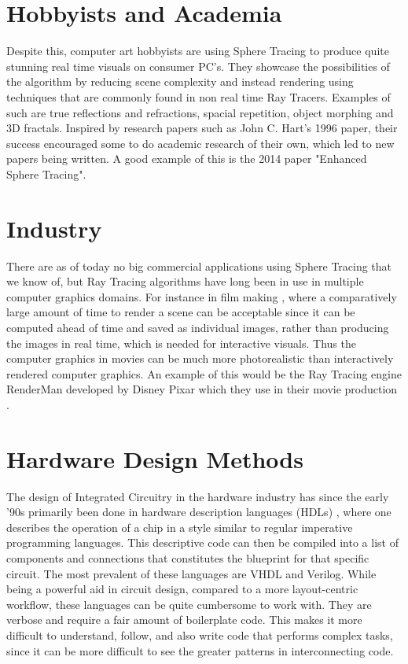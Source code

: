 	\section{ Hobbyists and Academia }

		Despite this, computer art hobbyists are using Sphere Tracing to
		produce quite stunning real time visuals on consumer PC's. They
		showcase the possibilities of the algorithm by reducing scene
		complexity and instead rendering using techniques that are commonly
		found in non real time Ray Tracers. Examples of such are true
		reflections and refractions, spacial repetition, object morphing and 3D
		fractals\cite{InigoQuilez}.  Inspired by research papers such as John
		C. Hart's 1996 paper\cite{Hart1996}, their success encouraged some
		to do academic research of their own, which led to new papers being
		written. A good example of this is the 2014 paper "Enhanced Sphere
		Tracing"\cite{Korndorfer2014}.

	\section{ Industry }		

		There are as of today no big commercial applications using Sphere Tracing
		that we know of, but Ray Tracing algorithms have long been in use in
		multiple computer graphics domains. For instance in film making
		\cite{Christensen2006}, where a comparatively large amount of time to
		render a scene can be acceptable since it can be computed ahead of time
		and saved as individual images, rather than producing the images in real
		time, which is needed for interactive visuals. Thus the computer
		graphics in movies can be much more photorealistic than interactively
		rendered computer graphics. An example of this would be the Ray Tracing
		engine RenderMan developed by Disney Pixar which they use in their movie 
		production \cite{Christensen2006}.

	\section{ Hardware Design Methods } 
	
		The design of Integrated Circuitry in the hardware industry has since
		the early '90s primarily been done in hardware description languages
		(HDLs) \cite{Chen2012}, where one describes the operation of a chip in a
		style similar to regular imperative programming languages. This
		descriptive code can then be compiled into a list of components and
		connections that constitutes the blueprint for that specific circuit.
		The most prevalent of these languages are VHDL and Verilog\cite{Chen2012}.
		While being a powerful aid in circuit design, compared to a more 
		layout-centric workflow, %
		these languages can be quite cumbersome to work with. They are verbose
		and require a fair amount of boilerplate code. This makes it more
		difficult to understand, follow, and also write code that performs
		complex tasks, since it can be more difficult to see the greater
		patterns in interconnecting code\cite{TODO}.
		

